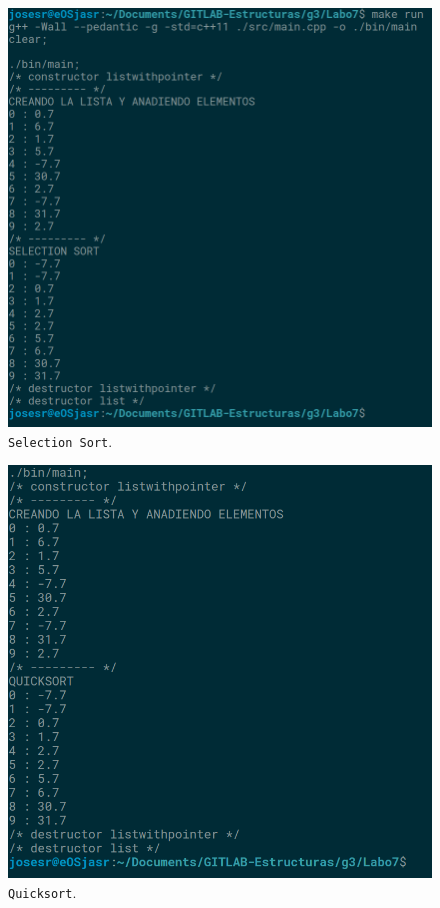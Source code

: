 \begin{figure}[H]
\centering
\includegraphics[width=\textwidth]{imgs/Labo7/selection(1).png}
\caption{\texttt{Selection Sort}.}
\label{fig:slect}
\end{figure}

\begin{figure}[H]
\centering
\includegraphics[width=\textwidth]{imgs/Labo7/quick.png}
\caption{\texttt{Quicksort}.}
\label{fig:quick}
\end{figure}

